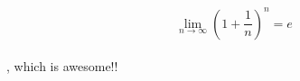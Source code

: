 \documentclass[preview]{standalone}
\begin{document}
\begin{center}
$$\lim_{n \to \infty} (1 + \frac 1n)^n = e$$ \\, which is awesome!!
\end{center}
\end{document}
